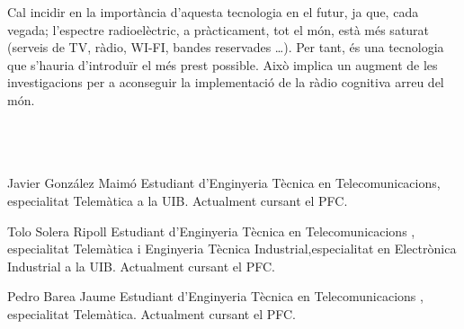 \documentclass[10pt,journal,a4paper]{IEEEtran}
\begin{document}
Cal incidir en la importància d’aquesta tecnologia en el futur, ja que, cada vegada; l’espectre radioelèctric, a pràcticament, tot el món, està més saturat (serveis de TV, ràdio, WI-FI, bandes reservades \ldots).
Per tant, és una tecnologia que s’hauria d’introduïr el més prest possible. Això implica un augment de les investigacions per a aconseguir la implementació de la ràdio cognitiva arreu del món.
\\
\\
\\
\\
\newline


\begin{IEEEbiography}{Javier González Maimó}
Estudiant d'Enginyeria Tècnica en Telecomunicacions, especialitat Telemàtica a la UIB. Actualment cursant el PFC.
\end{IEEEbiography}
\begin{IEEEbiography}{Tolo Solera Ripoll}
Estudiant d'Enginyeria Tècnica en Telecomunicacions , especialitat Telemàtica i Enginyeria Tècnica Industrial,especialitat en Electrònica Industrial  a la UIB. Actualment cursant el PFC.
\end{IEEEbiography}

\begin{IEEEbiography}{Pedro Barea Jaume }
Estudiant d'Enginyeria Tècnica en Telecomunicacions , especialitat Telemàtica. Actualment cursant el PFC.
\end{IEEEbiography}
\end{document}
